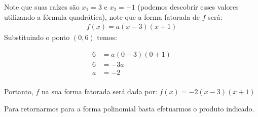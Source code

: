 Note que suas raízes são \(x_1=3\) e \(x_2=-1\) (podemos descobrir esses valores utilizando a fórmula quadrática), note que a forma fatorada de \(f\) será:
\begin{equation*}
\begin{split}f(x)=a(x-3)(x+1)\end{split}
\end{equation*}
Substituindo o ponto \((0,6)\) temos:

\begin{align*}
6&=a(0-3)(0+1)\\
6&=-3a\\
a&=-2\\
\end{align*}


Portanto, \(f\) na sua forma fatorada será dada por: \(f(x)=-2(x-3)(x+1)\)

Para retornarmos para a forma polinomial basta efetuarmos o produto indicado.


